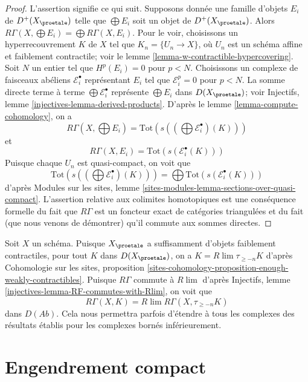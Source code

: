 \begin{proof}
L'assertion signifie ce qui suit. Supposons donnée une famille d'objets
$E_i$ de $D^+(X_\proetale)$ telle que $\bigoplus E_i$ soit un objet
de $D^+(X_\proetale)$. Alors
$R\Gamma(X, \bigoplus E_i) = \bigoplus R\Gamma(X, E_i)$.
Pour le voir, choisissons un hyperrecouvrement $K$ de $X$ tel que $K_n = \{U_n \to X\}$,
où $U_n$ est un schéma affine et faiblement contractile; voir le
lemme \ref{lemma-w-contractible-hypercovering}.
Soit $N$ un entier tel que $H^p(E_i) = 0$ pour $p < N$.
Choisissons un complexe de faisceaux abéliens $\mathcal{E}_i^\bullet$
représentant $E_i$ tel que $\mathcal{E}_i^p = 0$ pour $p < N$.
La somme directe terme à terme $\bigoplus \mathcal{E}_i^\bullet$ représente
$\bigoplus E_i$ dans $D(X_\proetale)$; voir
Injectifs, lemme \ref{injectives-lemma-derived-products}.
D'après le lemme \ref{lemma-compute-cohomology}, on a
$$
R\Gamma(X, \bigoplus E_i) =
\text{Tot}(s((\bigoplus \mathcal{E}^\bullet_i)(K)))
$$
et
$$
R\Gamma(X, E_i) = \text{Tot}(s(\mathcal{E}^\bullet_i(K)))
$$
Puisque chaque $U_n$ est quasi-compact, on voit que
$$
\text{Tot}(s((\bigoplus \mathcal{E}^\bullet_i)(K))) =
\bigoplus \text{Tot}(s(\mathcal{E}^\bullet_i(K)))
$$
d'après Modules sur les sites, lemme
\ref{sites-modules-lemma-sections-over-quasi-compact}.
L'assertion relative aux colimites homotopiques est une conséquence formelle du fait
que $R\Gamma$ est un foncteur exact de catégories triangulées et du
fait (que nous venons de démontrer) qu'il commute aux sommes directes.
\end{proof}

\begin{remark}
\label{remark-extend-to-all}
Soit $X$ un schéma. Puisque $X_\proetale$ a suffisamment d'objets faiblement contractiles,
pour tout $K$ dans $D(X_\proetale)$, on a $K = R\lim \tau_{\geq -n}K$
d'après
Cohomologie sur les sites, proposition
\ref{sites-cohomology-proposition-enough-weakly-contractibles}.
Puisque $R\Gamma$ commute à $R\lim$ d'après
Injectifs, lemme \ref{injectives-lemma-RF-commutes-with-Rlim},
on voit que
$$
R\Gamma(X, K) = R\lim R\Gamma(X, \tau_{\geq -n}K)
$$
dans $D(\textit{Ab})$. Cela nous permettra parfois d'étendre à tous les complexes
des résultats établis pour les complexes bornés inférieurement.
\end{remark}







\section{Engendrement compact}
\label{section-compact-generation}

